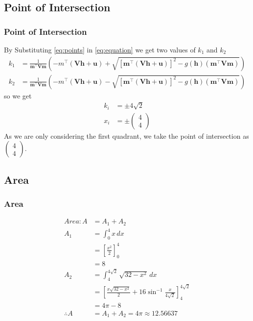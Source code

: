 \documentclass{beamer}
\providecommand{\sbrak}[1]{\ensuremath{{}\left[#1\right]}}
\providecommand{\brak}[1]{\ensuremath{\left(#1\right)}}
\theoremstyle{remark}
\newcommand{\myvec}[1]{\ensuremath{\begin{pmatrix}#1\end{pmatrix}}}
\let\vec\mathbf
\numberwithin{equation}{section}
\begin{document}
\subsection{Point of Intersection}
\begin{frame}
\frametitle{Point of Intersection}
	By Substituting \eqref{eq:points} in \eqref{eq:equation} we get two values of $k_1$ and $k_2$
%
\begin{align}
	k_1 &= \frac{1}{\vec{m}^\top \vec{V}\vec{m}}\brak{-m^\top\brak{\vec{V}\vec{h}+\vec{u}}+ \sqrt{[\vec{m}^\top \brak{\vec{V}\vec{h}+\vec{u}}]^2 - g(\vec{h})\brak{\vec{m}^\top\vec{V}\vec{m}}}}  \\
	k_2 &= \frac{1}{\vec{m}^\top \vec{V}\vec{m}}\brak{-m^\top\brak{\vec{V}\vec{h}+\vec{u}}- \sqrt{[\vec{m}^\top \brak{\vec{V}\vec{h}+\vec{u}}]^2 - g(\vec{h})\brak{\vec{m}^\top\vec{V}\vec{m}}}}
\end{align}
so we get 
\begin{align}
	k_i &= \pm 4\sqrt{2}\\
    x_i &= \pm \myvec{4\\4}
\end{align}
As we are only considering the first quadrant, we take the point of intersection as $\myvec{4\\4}$.

\end{frame}
\subsection{Area}
\begin{frame}[fragile]
\frametitle{Area}
\begin{align}
	Area: A &= A_1 + A_2 \label{eq:total_area} \\
    A_1 &= \int_{0}^{4} x \, dx \\
    &= \sbrak{\frac{x^2}{2}}_{0}^{4} \\
    &= 8 \\
    A_2 &= \int_{4}^{4\sqrt{2}} \sqrt{32 - x^2} \, dx \\
    &= \sbrak{\frac{x\sqrt{32 - x^2}}{2} + 16\sin^{-1}{\frac{x}{4\sqrt{2}}}}_{4}^{4\sqrt{2}} \\
    &= 4\pi - 8 \\
    \therefore A &= A_1 + A_2 = 4\pi \approx 12.56637
\end{align}%
\end{frame}
\end{document}

